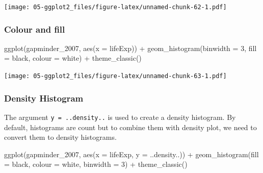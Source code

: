 \documentclass[
]{book}
\newenvironment{Shaded}{\begin{snugshade}}{\end{snugshade}}
\newcommand{\AttributeTok}[1]{\textcolor[rgb]{0.77,0.63,0.00}{#1}}
\newcommand{\DecValTok}[1]{\textcolor[rgb]{0.00,0.00,0.81}{#1}}
\newcommand{\FunctionTok}[1]{\textcolor[rgb]{0.00,0.00,0.00}{#1}}
\newcommand{\NormalTok}[1]{#1}
\newcommand{\SpecialCharTok}[1]{\textcolor[rgb]{0.00,0.00,0.00}{#1}}
\newcommand{\StringTok}[1]{\textcolor[rgb]{0.31,0.60,0.02}{#1}}
\begin{document}
\texttt{[image: 05-ggplot2\_files/figure-latex/unnamed-chunk-62-1.pdf]}

\hypertarget{colour-and-fill}{%
\subsubsection{Colour and fill}\label{colour-and-fill}}

\begin{Shaded}
\begin{Highlighting}[]
\FunctionTok{ggplot}\NormalTok{(gapminder\_2007, }\FunctionTok{aes}\NormalTok{(}\AttributeTok{x =}\NormalTok{ lifeExp)) }\SpecialCharTok{+} 
   \FunctionTok{geom\_histogram}\NormalTok{(}\AttributeTok{binwidth =} \DecValTok{3}\NormalTok{, }\AttributeTok{fill =} \StringTok{\textquotesingle{}black\textquotesingle{}}\NormalTok{, }\AttributeTok{colour =} \StringTok{\textquotesingle{}white\textquotesingle{}}\NormalTok{) }\SpecialCharTok{+}
   \FunctionTok{theme\_classic}\NormalTok{()}
\end{Highlighting}
\end{Shaded}

\texttt{[image: 05-ggplot2\_files/figure-latex/unnamed-chunk-63-1.pdf]}

\hypertarget{density-histogram}{%
\subsubsection{Density Histogram}\label{density-histogram}}

The argument \texttt{y\ =\ ..density..} is used to create a density histogram. By default, histograms are count but to combine them with density plot, we need to convert them to density histograms.

\begin{Shaded}
\begin{Highlighting}[]
\FunctionTok{ggplot}\NormalTok{(gapminder\_2007, }\FunctionTok{aes}\NormalTok{(}\AttributeTok{x =}\NormalTok{ lifeExp, }\AttributeTok{y =}\NormalTok{ ..density..)) }\SpecialCharTok{+} 
   \FunctionTok{geom\_histogram}\NormalTok{(}\AttributeTok{fill =} \StringTok{\textquotesingle{}black\textquotesingle{}}\NormalTok{, }\AttributeTok{colour =} \StringTok{\textquotesingle{}white\textquotesingle{}}\NormalTok{, }\AttributeTok{binwidth =} \DecValTok{3}\NormalTok{) }\SpecialCharTok{+}
   \FunctionTok{theme\_classic}\NormalTok{()}
\end{Highlighting}
\end{Shaded}
\end{document}
